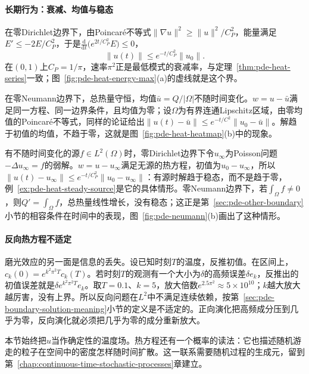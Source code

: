 \paragraph{长期行为：衰减、均值与稳态}
在零Dirichlet边界下，由Poincaré不等式$\|\nabla u\|^2\geq\|u\|^2/C_P^2$，能量满足$E'\leq-2E/C_P^2$，于是$\frac{\mathrm d}{\mathrm dt}\bigl(e^{2t/C_P^2}E\bigr)\leq0$，
\[
  \|u(t)\|\leq e^{-t/C_P^2}\|u_0\| .
\]
在$(0,1)$上$C_P=1/\pi$，速率$\pi^2$正是最低模式的衰减率，与定理~\ref{thm:pde-heat-series}一致；图~\ref{fig:pde-heat-energy-max}(a)的虚线就是这个界。

在零Neumann边界下，总热量守恒，均值$\bar u=Q/|\Omega|$不随时间变化。$w=u-\bar u$满足同一方程、同一边界条件，且均值为零；设$\Omega$为有界连通Lipschitz区域，由零均值的Poincaré不等式，同样的论证给出$\|u(t)-\bar u\|\leq e^{-t/C^2}\|u_0-\bar u\|$。解趋于初值的均值，不趋于零，这就是图~\ref{fig:pde-heat-heatmap}(b)中的现象。

有不随时间变化的源$f\in L^2(\Omega)$时，零Dirichlet边界下令$u_\infty$为Poisson问题$-\Delta u_\infty=f$的弱解。$w=u-u_\infty$满足无源的热方程，初值为$u_0-u_\infty$，所以$\|u(t)-u_\infty\|\leq e^{-t/C_P^2}\|u_0-u_\infty\|$：有源时解趋于稳态，而不是趋于零，例~\ref{ex:pde-heat-steady-source}是它的具体情形。零Neumann边界下，若$\int_\Omega f\neq0$，则$Q'=\int_\Omega f$，总热量线性增长，没有稳态；这正是第~\ref{sec:pde-other-boundary}小节的相容条件在时间中的表现，图~\ref{fig:pde-neumann}(b)画出了这种情形。

\paragraph{反向热方程不适定}
磨光效应的另一面是信息的丢失。设已知时刻$T$的温度，反推初值。在区间上，$c_k(0)=e^{k^2\pi^2T}c_k(T)$。若时刻$T$的观测有一个大小为$\delta$的高频误差$\delta e_k$，反推出的初值误差就是$\delta e^{k^2\pi^2T}e_k$。取$T=0.1$、$k=5$，放大倍数$e^{2.5\pi^2}\approx5\times10^{10}$；$k$越大放大越厉害，没有上界。所以反向问题在$L^2$中不满足连续依赖，按第~\ref{sec:pde-boundary-solution-meaning}小节的定义是不适定的。正向演化把高频成分压到几乎为零，反向演化就必须把几乎为零的成分重新放大。

本节始终把$u$当作确定性的温度场。热方程还有一个概率的读法：它也描述随机游走的粒子在空间中的密度怎样随时间扩散。这一联系需要随机过程的生成元，留到第~\ref{chap:continuous-time-stochastic-processes}章建立。
